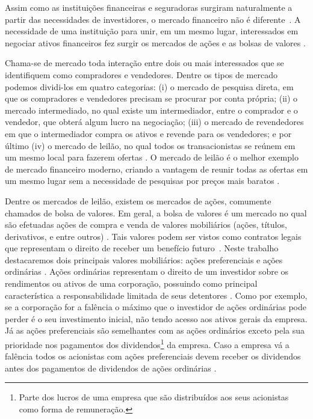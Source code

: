 Assim como as instituições financeiras e seguradoras surgiram naturalmente a partir das necessidades de investidores, o mercado financeiro não é diferente~\cite{investments}. A necessidade de uma instituição para unir, em um mesmo lugar, interessados em negociar ativos financeiros fez surgir os mercados de ações e as bolsas de valores \cite{investments}.

Chama-se de mercado toda interação entre dois ou mais interessados que se identifiquem como compradores e vendedores. Dentre os tipos de mercado podemos dividi-los em quatro categorias: (i) o mercado de pesquisa direta, em que os compradores e vendedores precisam se procurar por conta própria; (ii) o mercado intermediado, no qual existe um intermediador, entre o comprador e o vendedor, que obterá algum lucro na negociação; (iii) o mercado de revendedores em que o intermediador compra os ativos e revende para os vendedores; e por último (iv) o mercado de leilão, no qual todos os transacionistas se reúnem em um mesmo local para fazerem ofertas \cite{investments}. O mercado de leilão é o melhor exemplo de mercado financeiro moderno, criando a vantagem de reunir todas as ofertas em um mesmo lugar sem a necessidade de pesquisas por preços mais baratos \cite{investments}.

Dentre os mercados de leilão, existem os mercados de ações, comumente chamados de bolsa de valores. Em geral, a bolsa de valores é um mercado no qual são efetuadas ações de compra e venda de valores mobiliários (ações, títulos, derivativos, e entre outros) \cite{gomes1997bolsa}. Tais valores podem ser vistos como contratos legais que representam o direito de receber um benefício futuro~\cite{elton2012moderna}. Neste trabalho destacaremos dois principais valores mobiliários: ações preferenciais e ações ordinárias \cite{elton2012moderna}. Ações ordinárias representam o direito de um investidor sobre os rendimentos ou ativos de uma corporação, possuindo como principal característica a responsabilidade limitada de seus detentores \cite{investments}. Como por exemplo, se a corporação for a falência o máximo que o investidor de ações ordinárias pode perder é o seu investimento inicial, não tendo acesso aos ativos gerais da empresa. Já as ações preferenciais são semelhantes com as ações ordinários exceto pela sua prioridade nos pagamentos dos dividendos\footnote{Parte dos lucros de uma empresa que são distribuídos aos seus acionistas como forma de remuneração.} da empresa. Caso a empresa vá a falência todos os acionistas com ações preferenciais devem receber os dividendos antes dos pagamentos de dividendos de ações ordinárias \cite{elton2012moderna}.

